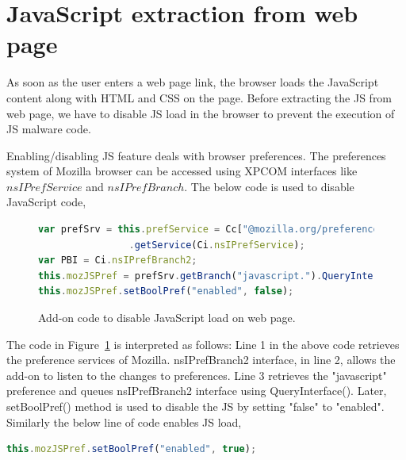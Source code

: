 \section{JavaScript extraction from web page}

As soon as the user enters a web page link, the browser loads the JavaScript content along with HTML and CSS on the page. Before extracting the JS from web page, we have to disable JS load in the browser to prevent the execution of JS malware code.

Enabling/disabling JS feature deals with browser preferences. The preferences system of Mozilla browser can be accessed using XPCOM interfaces like $nsIPrefService$ and $nsIPrefBranch$. The below code is used to disable JavaScript code,

\begin{figure}[h]
  \centering

\begin{lstlisting}[language=JavaScript] 
var prefSrv = this.prefService = Cc["@mozilla.org/preferences-service;1"]
                .getService(Ci.nsIPrefService);
var PBI = Ci.nsIPrefBranch2;
this.mozJSPref = prefSrv.getBranch("javascript.").QueryInterface(PBI);
this.mozJSPref.setBoolPref("enabled", false);
\end{lstlisting}
    \caption[Add-on code to disable JavaScript load on web page]{Add-on code to disable JavaScript load on web page.}
    \label{fig:disablejs}
\end{figure}

The code in Figure~\ref{fig:disablejs} is interpreted as follows: Line 1 in the above code retrieves the preference services of Mozilla. nsIPrefBranch2 interface, in line 2, allows the add-on to listen to the changes to preferences. Line 3 retrieves the "javascript" preference and queues nsIPrefBranch2 interface using QueryInterface(). Later, setBoolPref() method is used to disable the JS by setting "false" to "enabled". Similarly the below line of code enables JS load,
\begin{lstlisting}[language=JavaScript] 
this.mozJSPref.setBoolPref("enabled", true); 
\end{lstlisting}

